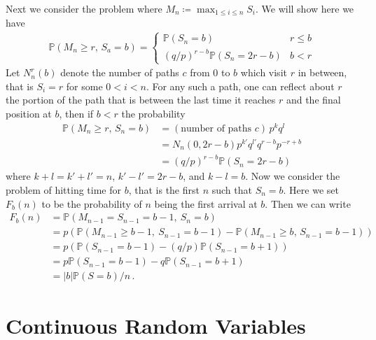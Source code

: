 \documentclass[11pt, onesided]{book}
\theoremstyle{break}
\theoremstyle{break}
\begin{document}
Next we consider the problem where $M_n \coloneqq \max_{1\leq i \leq n}S_i$. We will show here we have
\begin{align*}
\mathbb{P}(M_n \geq r,\, S_a = b) = \begin{cases}
\mathbb{P}(S_n =b) & r\leq b\\
(q/p)^{r-b}\mathbb{P}(S_n = 2r-b) & b<r
\end{cases}
\end{align*}
Let $N_n^r(b)$ denote the number of paths $c$ from $0$ to $b$ which visit $r$ in between, that is $S_i = r$ for some $0< i < n$. For any such a path, one can reflect about $r$ the portion of the path that is between the last time it reaches $r$ and the final position at $b$, then if $b<r$ the probability 
\begin{align*}
\mathbb{P}(M_n \geq r,\, S_n = b) 
&= (\text{number of paths }c)\,p^kq^l \\
&= N_n(0,2r-b)p^{k'}q^{l'}q^{r-b}p^{-r+b} \\
&= (q/p)^{r-b}\mathbb{P}(S_n = 2r-b)
\end{align*}
where $k+l=k'+l' = n$, $k'-l' = 2r-b$, and $k-l = b$.  Now we consider the problem of hitting time for $b$, that is the first $n$ such that $S_n = b$. 
Here we set $F_b(n)$ to be the probability of $n$ being the first arrival at $b$. Then we can write
\begin{align*}
F_b(n) 
&= \mathbb{P}(M_{n-1} = S_{n-1} = b-1,\ S_n=b) \\
&= p\left(\mathbb{P}(M_{n-1}\geq b-1, \ S_{n-1} = b-1 ) - \mathbb{P}(M_{n-1}\geq b,\, S_{n-1} = b-1)\right)\\
&= p\left(\mathbb{P}(S_{n-1} = b-1) - (q/p)\mathbb{P}(S_{n-1}=b+1)\right) \\
&= p\mathbb{P}(S_{n-1} = b-1) - q\mathbb{P}(S_{n-1}=b+1) \\
&= |b|\mathbb{P}(S=b)/n\,.
\end{align*}

 


\newpage
\chapter{Continuous Random Variables}
\setcounter{section}{10}
\end{document}
